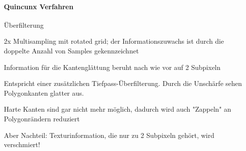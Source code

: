 \documentclass[landscape]{article}
\begin{document}
\begin{multicols}{3}
  \paragraph{Quincunx Verfahren}
  \begin{itemize*}
    \item Überfilterung
    \item 2x Multisampling mit rotated grid; der Informationszuwachs ist durch die doppelte Anzahl von Samples gekennzeichnet
    \item Information für die Kantenglättung beruht nach wie vor auf 2 Subpixeln
    \item Entspricht einer zusätzlichen Tiefpass-Überfilterung. Durch die Unschärfe sehen Polygonkanten glatter aus.
    \item Harte Kanten sind gar nicht mehr möglich, dadurch wird auch "Zappeln" an Polygonrändern reduziert
    \item Aber Nachteil: Texturinformation, die nur zu 2 Subpixeln gehört, wird verschmiert!
  \end{itemize*}
  

\end{multicols}
\end{document}
